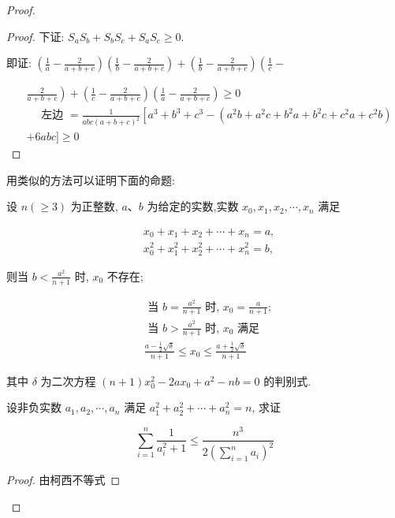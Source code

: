 \begin{proof}
\begin{example}
\begin{proof}
	下证: $S_{a} S_{b}+S_{b} S_{c}+S_{a} S_{c} \geqslant 0$.
	
	即证: $\left(\frac{1}{a}-\frac{2}{a+b+c}\right)\left(\frac{1}{b}-\frac{2}{a+b+c}\right)+\left(\frac{1}{b}-\frac{2}{a+b+c}\right)\left(\frac{1}{c}-\right.$
	
	$$
	\begin{aligned}
	& \left.\frac{2}{a+b+c}\right)+\left(\frac{1}{c}-\frac{2}{a+b+c}\right)\left(\frac{1}{a}-\frac{2}{a+b+c}\right) \geqslant 0 \\
	& \quad \text { 左边 }=\frac{1}{a b c(a+b+c)^{2}}\left[a^{3}+b^{3}+c^{3}-\left(a^{2} b+a^{2} c+b^{2} a+b^{2} c+c^{2} a+c^{2} b\right)\right. \\
	& +6 a b c] \geqslant 0
	\end{aligned}
	$$
\end{proof}
\begin{note}
	用类似的方法可以证明下面的命题:
	
	设 $n(\geqslant 3)$ 为正整数, $a 、 b$ 为给定的实数,实数 $x_{0}, x_{1}, x_{2}, \cdots, x_{n}$ 满足
	
	$$
	\begin{aligned}
	& x_{0}+x_{1}+x_{2}+\cdots+x_{n}=a, \\
	& x_{0}^{2}+x_{1}^{2}+x_{2}^{2}+\cdots+x_{n}^{2}=b,
	\end{aligned}
	$$
	
	则当 $b<\frac{a^{2}}{n+1}$ 时, $x_{0}$ 不存在;
	
	$$
	\begin{aligned}
	& \text { 当 } b=\frac{a^{2}}{n+1} \text { 时, } x_{0}=\frac{a}{n+1} \text {; } \\
	& \text { 当 } b>\frac{a^{2}}{n+1} \text { 时, } x_{0} \text { 满足 } \\
	& \frac{a-\frac{1}{2} \sqrt{\delta}}{n+1} \leqslant x_{0} \leqslant \frac{a+\frac{1}{2} \sqrt{\delta}}{n+1}
	\end{aligned}
	$$
	
	其中 $\delta$ 为二次方程 $(n+1) x_{0}^{2}-2 a x_{0}+a^{2}-n b=0$ 的判别式.
\end{note}

\begin{example}
	设非负实数 $a_{1}, a_{2}, \cdots, a_{n}$ 满足 $a_{1}^{2}+a_{2}^{2}+\cdots+a_{n}^{2}=n$, 求证
	
	$$
	\sum_{i=1}^{n} \frac{1}{a_{i}^{2}+1} \leqslant \frac{n^{3}}{2\left(\sum_{i=1}^{n} a_{i}\right)^{2}}
	$$
\end{example}
\begin{proof}
	由柯西不等式
	

\end{proof}
\end{example}
\end{proof}
